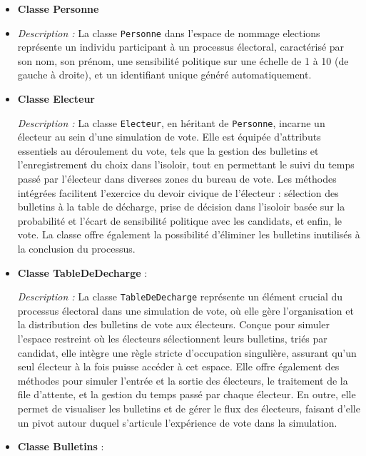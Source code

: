 \documentclass[12pt]{article} %
\begin{document}
\begin{itemize}[leftmargin=*,label={}]
	\item \textbf{Classe Personne}
	
	\item \textit{Description :} La classe \texttt{Personne} dans l'espace de nommage elections représente un individu participant à un processus électoral, caractérisé par son nom, son prénom, une sensibilité politique sur une échelle de 1 à 10 (de gauche à droite), et un identifiant unique généré automatiquement. 
	
	\item \textbf{Classe Electeur}
	
	\textit{Description :} La classe \texttt{Electeur}, en héritant de \texttt{Personne}, incarne un électeur au sein d'une simulation de vote. Elle est équipée d'attributs essentiels au déroulement du vote, tels que la gestion des bulletins et l'enregistrement du choix dans l'isoloir, tout en permettant le suivi du temps passé par l'électeur dans diverses zones du bureau de vote. Les méthodes intégrées facilitent l'exercice du devoir civique de l'électeur : sélection des bulletins à la table de décharge, prise de décision dans l'isoloir basée sur la probabilité et l'écart de sensibilité politique avec les candidats, et enfin, le vote. La classe offre également la possibilité d'éliminer les bulletins inutilisés à la conclusion du processus.
	
	\item \textbf{Classe TableDeDecharge} :
	
	\textit{Description :} La classe \texttt{TableDeDecharge} représente un élément crucial du processus électoral dans une simulation de vote, où elle gère l'organisation et la distribution des bulletins de vote aux électeurs. Conçue pour simuler l'espace restreint où les électeurs sélectionnent leurs bulletins, triés par candidat, elle intègre une règle stricte d'occupation singulière, assurant qu'un seul électeur à la fois puisse accéder à cet espace.
	Elle offre également des méthodes pour simuler l'entrée et la sortie des électeurs, le traitement de la file d'attente, et la gestion du temps passé par chaque électeur. En outre, elle permet de visualiser les bulletins et de gérer le flux des électeurs, faisant d'elle un pivot autour duquel s'articule l'expérience de vote dans la simulation. 
	
	\item \textbf{Classe Bulletins} :
	

\end{itemize}
\end{document}
